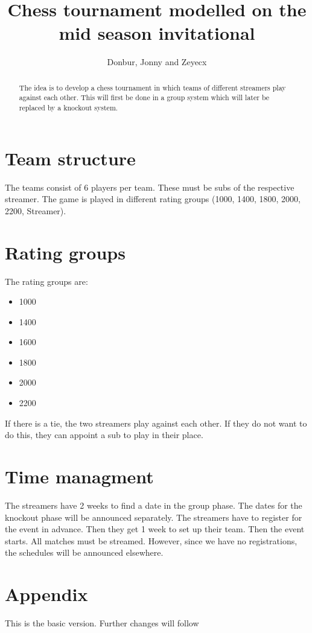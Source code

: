 \documentclass{osa-article}
\begin{document}
\title{Chess tournament modelled on the mid season invitational}

\author{Donbur, Jonny and Zeyecx}

\begin{abstract}
The idea is to develop a chess tournament in which teams of different streamers play against each other.
This will first be done in a group system which will later be replaced by a knockout system. 
\end{abstract}


\section{Team structure}
The teams consist of 6 players per team. These must be subs of the respective streamer. 
The game is played in different rating groups (1000, 1400, 1800, 2000, 2200, Streamer).

\section{Rating groups}

The rating groups are:
\begin{itemize}
    \item 1000
    \item 1400 
    \item 1600
    \item 1800
    \item 2000
    \item 2200
\end{itemize}
If there is a tie, the two streamers play against each other. If they do not want to do this, they can appoint a sub to play in their place.

\section{Time managment}
The streamers have 2 weeks to find a date in the group phase. The dates for the knockout phase will be announced separately.
The streamers have to register for the event in advance. Then they get 1 week to set up their team.
Then the event starts.
All matches must be streamed.
However, since we have no registrations, the schedules will be announced elsewhere.

\section{Appendix}
This is the basic version. Further changes will follow
\end{document}
